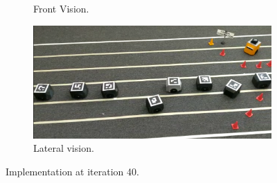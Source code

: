 \begin{appendix}
\begin{figure}[H]
\begin{subfigure}[b]{0.4\textwidth}
    \caption{Front Vision.}
    \label{fig:second}
\end{subfigure}
\hfill
\begin{subfigure}[b]{0.50\textwidth}
    \includegraphics[width=\textwidth]{Anexos/red_lane/red_lane_it40_cam2.png}
    \caption{Lateral vision.}
    \label{fig:third}
\end{subfigure}
\caption{Implementation at iteration 40.}
\label{fig:figures}
\end{figure}


\end{appendix}
